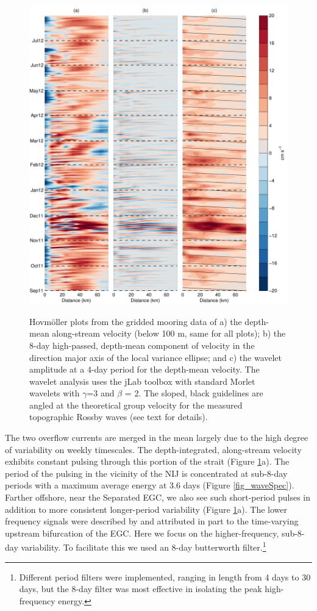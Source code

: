 \documentclass[12pt,titlepage,figuresatend]{article}
\begin{document}
\begin{figure}[p!]
  \centering\includegraphics[width=\hsize]{./figures/hoff_vars.pdf}
  \caption{Hovm\"{o}ller plots from the gridded mooring data of a) the depth-mean along-stream velocity (below 100 m, same for all plots); b) the 8-day high-passed, depth-mean component of velocity in the direction major axis of the local variance ellipse; and c) the wavelet amplitude at a 4-day period for the depth-mean velocity. The wavelet analysis uses the jLab toolbox \cite[]{Lilly2017} with standard Morlet wavelets with $\gamma$=3 and $\beta$ = 2. The sloped, black guidelines are angled at the theoretical group velocity for the measured topographic Rossby waves (see text for details).}{\label{fig_hoff}}
\end{figure}


The two overflow currents are merged in the mean largely due to the high degree of variability on weekly timescales. The depth-integrated, along-stream velocity exhibits constant pulsing through this portion of the strait (Figure \ref{fig_hoff}a). The period of the pulsing in the vicinity of the NIJ is concentrated at sub-8-day periods with a maximum average energy at 3.6 days (Figure \ref{fig_waveSpec}). Farther offshore, near the Separated EGC, we also see such short-period pulses in addition to more consistent longer-period variability (Figure \ref{fig_hoff}a). The lower frequency signals were described by \cite{Harden2016} and attributed in part to the time-varying upstream bifurcation of the EGC. Here we focus on the higher-frequency, sub-8-day variability. To facilitate this we used an 8-day butterworth filter.\footnote{Different period filters were implemented, ranging in length from 4 days to 30 days, but the 8-day filter was most effective in isolating the peak high-frequency energy.}
\end{document}
